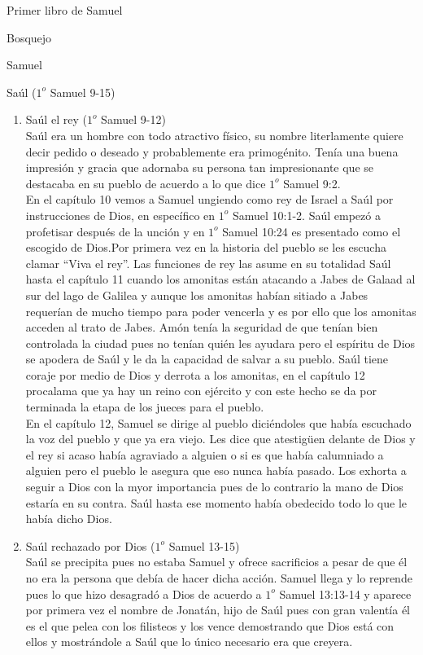 \begin{section}{Primer libro de Samuel}
\begin{subsection}{Bosquejo}
\begin{subsubsection}{Samuel}
\begin{enumerate}
			\end{enumerate}
		\end{subsubsection}
		\begin{subsubsection}{Saúl ($1^{o}$ Samuel 9-15)}
			\begin{enumerate}
				\item Saúl el rey ($1^{o}$ Samuel 9-12)\\
			Saúl era un hombre con todo atractivo físico, su nombre literlamente quiere decir pedido o deseado y probablemente era primogénito. Tenía una buena impresión y gracia que adornaba su persona tan impresionante que se destacaba en su pueblo de acuerdo a lo que dice $1^{o}$ Samuel 9:2.\\
			En el capítulo 10 vemos a Samuel ungiendo como rey de Israel a Saúl por instrucciones de Dios, en específico en $1^{o}$ Samuel 10:1-2. Saúl empezó a profetisar después de la unción y en $1^{o}$ Samuel 10:24 es presentado como el escogido de Dios.Por primera vez en la historia del pueblo se les escucha clamar ``Viva el rey''. Las funciones de rey las asume en su totalidad Saúl hasta el capítulo 11 cuando los amonitas están atacando a Jabes de Galaad al sur del lago de Galilea y aunque los amonitas habían sitiado a Jabes requerían de mucho tiempo para poder vencerla y es por ello que los amonitas acceden al trato de Jabes. Amón tenía la seguridad de que tenían bien controlada la ciudad pues no tenían quién les ayudara pero el espíritu de Dios se apodera de Saúl y le da la capacidad de salvar a su pueblo. Saúl tiene coraje por medio de Dios y derrota a los amonitas, en el capítulo 12 procalama que ya hay un reino con ejército y con este hecho se da por terminada la etapa de los jueces para el pueblo. \\
			En el capítulo 12, Samuel se dirige al pueblo diciéndoles que había escuchado la voz del pueblo y que ya era viejo. Les dice que atestigüen delante de Dios y el rey si acaso había agraviado a alguien o si es que había calumniado a alguien pero el pueblo le asegura que eso nunca había pasado. Los exhorta a seguir a Dios con la myor importancia pues de lo contrario la mano de Dios estaría en su contra. Saúl hasta ese momento había obedecido todo lo que le había dicho Dios.
		\item Saúl rechazado por Dios ($1^{o}$ Samuel 13-15)\\
			Saúl se precipita pues no estaba Samuel y ofrece sacrificios a pesar de que él no era la persona que debía de hacer dicha acción. Samuel llega y lo reprende pues lo que hizo desagradó a Dios de acuerdo a $1^{o}$ Samuel 13:13-14 y aparece por primera vez el nombre de Jonatán, hijo de Saúl pues con gran valentía él es el que pelea con los filisteos y los vence demostrando que Dios está con ellos y mostrándole a Saúl que lo único necesario era que creyera.

\end{enumerate}
\end{subsubsection}
\end{subsection}
\end{section}
